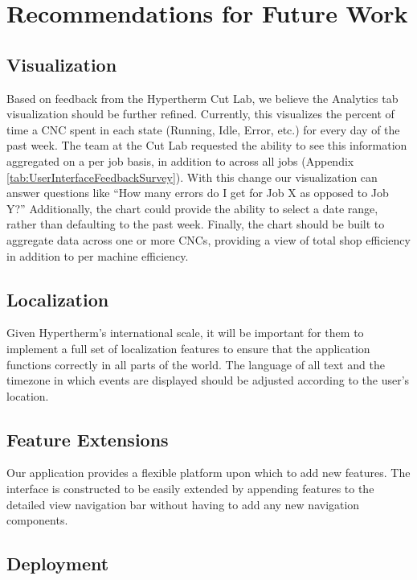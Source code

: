 \documentclass[12pt,letterpaper,titlepage]{article}
\begin{document}
\section{Recommendations for Future Work} \label{sec:RecommendationsforFutureWork}

\subsection{Visualization} \label{sec:Visualization}

Based on feedback from the Hypertherm Cut Lab, we believe the Analytics tab visualization should be further refined. Currently, this visualizes the percent of time a CNC spent in each state (Running, Idle, Error, etc.) for every day of the past week. The team at the Cut Lab requested the ability to see this information aggregated on a per job basis, in addition to across all jobs (Appendix \ref{tab:UserInterfaceFeedbackSurvey}). With this change our visualization can answer questions like ``How many errors do I get for Job X as opposed to Job Y?'' Additionally, the chart could provide the ability to select a date range, rather than defaulting to the past week. Finally, the chart should be built to aggregate data across one or more CNCs, providing a view of total shop efficiency in addition to per machine efficiency.

\subsection{Localization} \label{sec:Localization}

Given Hypertherm's international scale, it will be important for them to implement a full set of localization features to ensure that the application functions correctly in all parts of the world. The language of all text and the timezone in which events are displayed should be adjusted according to the user's location.

\subsection{Feature Extensions} \label{sec:FeatureExtensions}

Our application provides a flexible platform upon which to add new features. The interface is constructed to be easily extended by appending features to the detailed view navigation bar without having to add any new navigation components.

\subsection{Deployment} \label{sec:Deployment}
\end{document}
